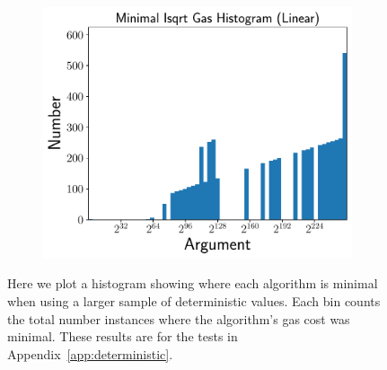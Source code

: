 \begin{figure}[p]
    \begin{subfigure}[t]{0.45\textwidth}
    \includegraphics[width=\textwidth]{plots/minimal_hist_Linear_ed.pdf}
    \end{subfigure}
    \caption{Here we plot a histogram showing where each algorithm is minimal
        when using a larger sample of deterministic values.
        Each bin counts the total number instances where the algorithm's
        gas cost was minimal.
        These results are for the tests in Appendix~\ref{app:deterministic}.
        }
    \label{fig:minimal_gas_hist_ed}
\end{figure}
